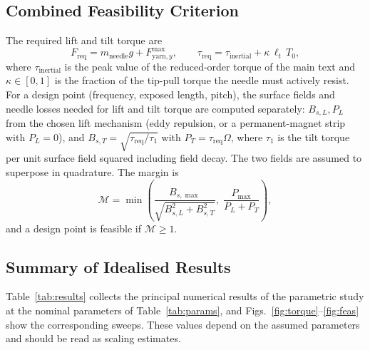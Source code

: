 \documentclass[12pt, a4paper]{article}
\begin{document}
\subsection{Combined Feasibility Criterion}

The required lift and tilt torque are
\begin{equation}
F_{\text{req}}=m_{\text{needle}}g+F_{\text{yarn},y}^{\max},
\qquad
\tau_{\text{req}}=\tau_{\text{inertial}}+\kappa\,\ell_t\,T_0,
\end{equation}
where $\tau_{\text{inertial}}$ is the peak value of the reduced-order torque of the main text and $\kappa\in[0,1]$ is the fraction of the tip-pull torque the needle must actively resist. For a design point (frequency, exposed length, pitch), the surface fields and needle losses needed for lift and tilt torque are computed separately: $B_{s,L},P_L$ from the chosen lift mechanism (eddy repulsion, or a permanent-magnet strip with $P_L=0$), and $B_{s,T}=\sqrt{\tau_{\text{req}}/\tau_1}$ with $P_T=\tau_{\text{req}}\Omega$, where $\tau_1$ is the tilt torque per unit surface field squared including field decay. The two fields are assumed to superpose in quadrature. The margin is
\begin{equation}
\mathcal{M}=\min\!\left(\frac{B_{s,\max}}{\sqrt{B_{s,L}^{2}+B_{s,T}^{2}}},\;\frac{P_{\max}}{P_L+P_T}\right),
\end{equation}
and a design point is feasible if $\mathcal{M}\ge1$.

\subsection{Summary of Idealised Results}

Table~\ref{tab:results} collects the principal numerical results of the parametric study at the nominal parameters of Table~\ref{tab:params}, and Figs.~\ref{fig:torque}--\ref{fig:feas} show the corresponding sweeps. These values depend on the assumed parameters and should be read as scaling estimates.
\end{document}
